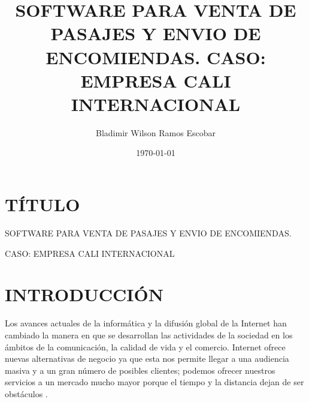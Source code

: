 \documentclass[12pt,letterpaper]{article}
\title{SOFTWARE PARA VENTA DE PASAJES Y ENVIO DE ENCOMIENDAS. CASO: EMPRESA CALI INTERNACIONAL}
\author{Bladimir Wilson Ramos Escobar}
\date{\today}
\begin{document}
\thispagestyle{empty}
  
\thispagestyle{empty}

\sloppy

\renewcommand{\contentsname}{\hfill\bfseries\normalsize ÍNDICE\hfill}
\tableofcontents
{}
\newpage
\setcounter{page}{1}
\section{TÍTULO}
  SOFTWARE PARA VENTA DE PASAJES Y ENVIO DE ENCOMIENDAS.
  
  CASO: EMPRESA CALI INTERNACIONAL
\section{INTRODUCCIÓN}

Los avances actuales de la informática y la difusión global de la Internet han cambiado la manera en que se desarrollan las actividades de la sociedad en los ámbitos de la comunicación, la calidad de vida y el comercio. Internet ofrece nuevas alternativas de negocio ya que esta nos permite llegar a una audiencia masiva y a un gran número de posibles clientes; podemos ofrecer nuestros servicios a un mercado mucho mayor porque el tiempo y la distancia dejan de ser obstáculos \parencite{anormaliza2009implementacion}.

\end{document}
